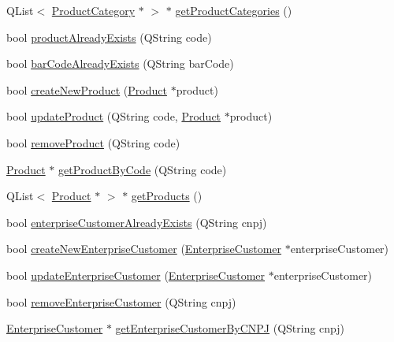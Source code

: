 \begin{DoxyCompactItemize}
\item 
\-Q\-List$<$ \hyperlink{class_product_category}{\-Product\-Category} $\ast$ $>$ $\ast$ \hyperlink{class_database_controller_ab657f783d27b7e113a8015d7dca0b90a}{get\-Product\-Categories} ()
\item 
bool \hyperlink{class_database_controller_a4e56ca88671780de9c8f34408de15fda}{product\-Already\-Exists} (\-Q\-String code)
\item 
bool \hyperlink{class_database_controller_a5ca316c830f686cc20cc61c7bd40bbb9}{bar\-Code\-Already\-Exists} (\-Q\-String bar\-Code)
\item 
bool \hyperlink{class_database_controller_a60bffb7dbde15af30200e8c50d64936d}{create\-New\-Product} (\hyperlink{class_product}{\-Product} $\ast$product)
\item 
bool \hyperlink{class_database_controller_af1afa55cfc341f31bd3918ecac6f534a}{update\-Product} (\-Q\-String code, \hyperlink{class_product}{\-Product} $\ast$product)
\item 
bool \hyperlink{class_database_controller_a714940a2c00aabf5fc8c7a5c86aa2dd9}{remove\-Product} (\-Q\-String code)
\item 
\hyperlink{class_product}{\-Product} $\ast$ \hyperlink{class_database_controller_ad6059dc18e8887203fe23ff63613ef78}{get\-Product\-By\-Code} (\-Q\-String code)
\item 
\-Q\-List$<$ \hyperlink{class_product}{\-Product} $\ast$ $>$ $\ast$ \hyperlink{class_database_controller_ae74f1211762753d8a99878b76ed17428}{get\-Products} ()
\item 
bool \hyperlink{class_database_controller_af1d0f2de9e28eb26556299cc7781c95a}{enterprise\-Customer\-Already\-Exists} (\-Q\-String cnpj)
\item 
bool \hyperlink{class_database_controller_a2109030ee813e32e0b23f5116a23c53c}{create\-New\-Enterprise\-Customer} (\hyperlink{class_enterprise_customer}{\-Enterprise\-Customer} $\ast$enterprise\-Customer)
\item 
bool \hyperlink{class_database_controller_a8c886cf20b33be6a16276890dc64a381}{update\-Enterprise\-Customer} (\hyperlink{class_enterprise_customer}{\-Enterprise\-Customer} $\ast$enterprise\-Customer)
\item 
bool \hyperlink{class_database_controller_a2f08da87cc66bb03de3171131702cd81}{remove\-Enterprise\-Customer} (\-Q\-String cnpj)
\item 
\hyperlink{class_enterprise_customer}{\-Enterprise\-Customer} $\ast$ \hyperlink{class_database_controller_ae86cb1117c55766d63dcb9b99f0079a2}{get\-Enterprise\-Customer\-By\-C\-N\-P\-J} (\-Q\-String cnpj)

\end{DoxyCompactItemize}
